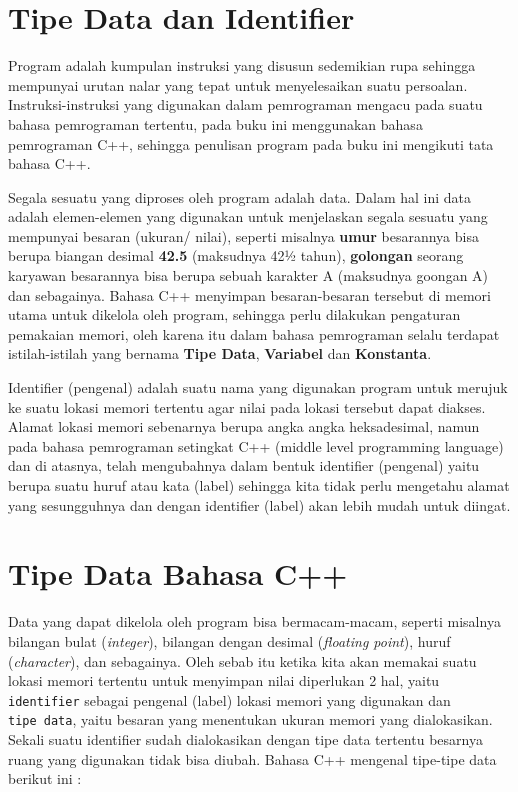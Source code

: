 
\section{Tipe Data dan
Identifier}\label{tipe-data-dan-identifier}

Program adalah kumpulan instruksi yang disusun sedemikian rupa sehingga
mempunyai urutan nalar yang tepat untuk menyelesaikan suatu persoalan.
Instruksi-instruksi yang digunakan dalam pemrograman mengacu pada suatu
bahasa pemrograman tertentu, pada buku ini menggunakan bahasa
pemrograman C++, sehingga penulisan program pada buku ini mengikuti tata
bahasa C++.

Segala sesuatu yang diproses oleh program adalah data. Dalam hal ini
data adalah elemen-elemen yang digunakan untuk menjelaskan segala
sesuatu yang mempunyai besaran (ukuran/ nilai), seperti misalnya
\textbf{umur} besarannya bisa berupa biangan desimal \textbf{42.5}
(maksudnya 42½ tahun), \textbf{golongan} seorang karyawan besarannya
bisa berupa sebuah karakter A (maksudnya goongan A) dan sebagainya.
Bahasa C++ menyimpan besaran-besaran tersebut di memori utama untuk
dikelola oleh program, sehingga perlu dilakukan pengaturan pemakaian
memori, oleh karena itu dalam bahasa pemrograman selalu terdapat
istilah-istilah yang bernama \textbf{Tipe Data}, \textbf{Variabel} dan
\textbf{Konstanta}.

Identifier (pengenal) adalah suatu nama yang digunakan program untuk
merujuk ke suatu lokasi memori tertentu agar nilai pada lokasi tersebut
dapat diakses. Alamat lokasi memori sebenarnya berupa angka angka
heksadesimal, namun pada bahasa pemrograman
setingkat C++ (middle level programming language) dan di atasnya, telah
mengubahnya dalam bentuk identifier (pengenal) yaitu berupa suatu huruf
atau kata (label) sehingga kita tidak perlu mengetahu alamat yang
sesungguhnya dan dengan identifier (label) akan lebih mudah untuk
diingat.

\section{Tipe Data Bahasa
	C++}\label{tipe-data-bahasa-c}

Data yang dapat dikelola oleh program bisa bermacam-macam, seperti
misalnya bilangan bulat (\emph{integer}), bilangan dengan desimal
(\emph{floating point}), huruf (\emph{character}), dan sebagainya. Oleh
sebab itu ketika kita akan memakai suatu lokasi memori tertentu untuk
menyimpan nilai diperlukan 2 hal, yaitu \texttt{identifier} sebagai
pengenal (label) lokasi memori yang digunakan dan \texttt{tipe\ data},
yaitu besaran yang menentukan ukuran memori yang dialokasikan. Sekali
suatu identifier sudah dialokasikan dengan tipe data tertentu besarnya
ruang yang digunakan tidak bisa diubah. Bahasa C++ mengenal tipe-tipe
data berikut ini :

